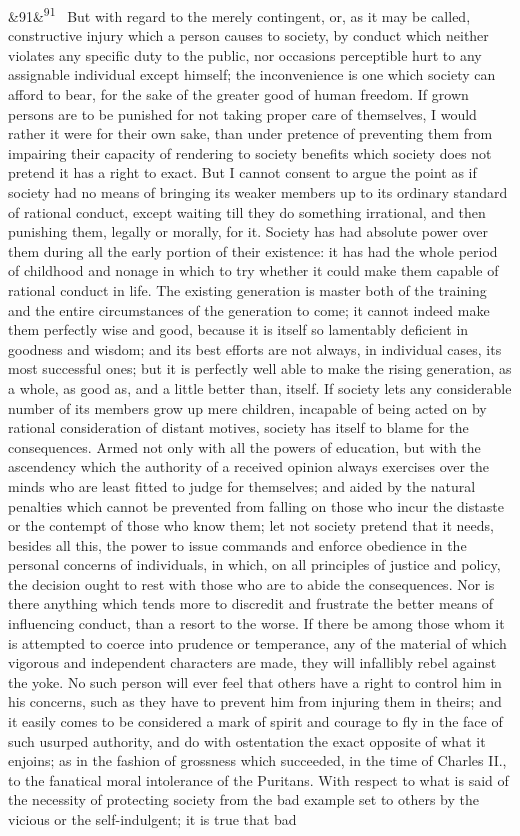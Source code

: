 \documentclass[12pt]{article}
\newcommand{\para}[1][]{\par\noindent\ifx&#1&\else\textsuperscript{\footnotesize #1}~\fi}
\begin{document}
\para[91] But with regard to the merely contingent, or, as it may be called, constructive injury which a person causes to society, by conduct which neither violates any specific duty to the public, nor occasions perceptible hurt to any assignable individual except himself; the inconvenience is one which society can afford to bear, for the sake of the greater good of human freedom. If grown persons are to be punished for not taking proper care of themselves, I would rather it were for their own sake, than under pretence of preventing them from impairing their capacity of rendering to society benefits which society does not pretend it has a right to exact. But I cannot consent to argue the point as if society had no means of bringing its weaker members up to its ordinary standard of rational conduct, except waiting till they do something irrational, and then punishing them, legally or morally, for it. Society has had absolute power over them during all the early portion of their existence: it has had the whole period of childhood and nonage in which to try whether it could make them capable of rational conduct in life. The existing generation is master both of the training and the entire circumstances of the generation to come; it cannot indeed make them perfectly wise and good, because it is itself so lamentably deficient in goodness and wisdom; and its best efforts are not always, in individual cases, its most successful ones; but it is perfectly well able to make the rising generation, as a whole, as good as, and a little better than, itself. If society lets any considerable number of its members grow up mere children, incapable of being acted on by rational consideration of distant motives, society has itself to blame for the consequences. Armed not only with all the powers of education, but with the ascendency which the authority of a received opinion always exercises over the minds who are least fitted to judge for themselves; and aided by the natural penalties which cannot be prevented from falling on those who incur the distaste or the contempt of those who know them; let not society pretend that it needs, besides all this, the power to issue commands and enforce obedience in the personal concerns of individuals, in which, on all principles of justice and policy, the decision ought to rest with those who are to abide the consequences. Nor is there anything which tends more to discredit and frustrate the better means of influencing conduct, than a resort to the worse. If there be among those whom it is attempted to coerce into prudence or temperance, any of the material of which vigorous and independent characters are made, they will infallibly rebel against the yoke. No such person will ever feel that others have a right to control him in his concerns, such as they have to prevent him from injuring them in theirs; and it easily comes to be considered a mark of spirit and courage to fly in the face of such usurped authority, and do with ostentation the exact opposite of what it enjoins; as in the fashion of grossness which succeeded, in the time of Charles II., to the fanatical moral intolerance of the Puritans. With respect to what is said of the necessity of protecting society from the bad example set to others by the vicious or the self-indulgent; it is true that bad 
\end{document}
